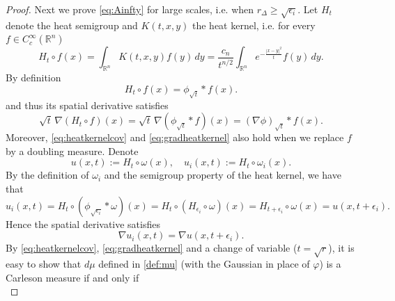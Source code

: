\documentclass[11pt, a4paper,leqno]{amsart}
\theoremstyle{plain}
\theoremstyle{definition}
\theoremstyle{remark}
\numberwithin{equation}{section}
\begin{document}
\begin{proof}
Next we prove \eqref{eq:Ainfty} for large scales, i.e. when $r_\Delta \geq \sqrt{\epsilon_i}$.
Let $H_t$ denote the heat semigroup and $K(t, x, y)$ the heat kernel, i.e. for every $f\in C_c^\infty(\mathbb{R}^n)$ 
\[ H_t \circ f(x) = \int_{\mathbb{R}^n} K(t,x,y) f(y) \, dy = \frac{c_n}{t^{n/2}} \int_{\mathbb{R}^n}  e^{-\frac{|x-y|^2}{t}} f(y) \, dy. \] 
By definition
\begin{equation}\label{eq:heatkernelcov}
	H_t \circ f(x) = \phi_{\sqrt{t}} \ast f(x). 
\end{equation} 
and thus its spatial derivative satisfies
\begin{equation}\label{eq:gradheatkernel}
	\sqrt{t} \, \nabla \left( H_t \circ f \right)(x) = \sqrt{t} \, \nabla \left( \phi_{\sqrt{t}} \ast f \right)(x) =   \left( \nabla \phi \right)_{\sqrt{t}} \ast f(x). 
\end{equation} 
Moreover, \eqref{eq:heatkernelcov} and \eqref{eq:gradheatkernel} also hold when we replace $f$ by a doubling measure.
Denote 
\[ u(x,t) := H_t \circ \omega(x), \quad u_i(x,t):= H_t \circ \omega_i(x). \]
By the definition of $\omega_i$ and the semigroup property of the heat kernel, we have that
\begin{equation}\label{eq:trsltime}
	u_i(x,t) = H_t \circ \left( \phi_{\sqrt{\epsilon_i}} \ast \omega \right)(x) = H_t \circ \left( H_{\epsilon_i} \circ \omega \right)(x) = H_{t+\epsilon_i} \circ \omega(x) = u(x, t+\epsilon_i). 
\end{equation} 
Hence the spatial derivative satisfies
\begin{equation}\label{eq:gradtrsltime}
	 \nabla u_i(x,t) = \nabla u(x,t+\epsilon_i).
\end{equation}
By \eqref{eq:heatkernelcov}, \eqref{eq:gradheatkernel} and a change of variable ($t = \sqrt{r}$), it is easy to show that $d\mu$ defined in \eqref{def:mu} (with the Gaussian in place of $\varphi$) is a Carleson measure if and only if
\begin{equation}\label{eq:uCarl}

\end{equation}
\end{proof}
\end{document}
